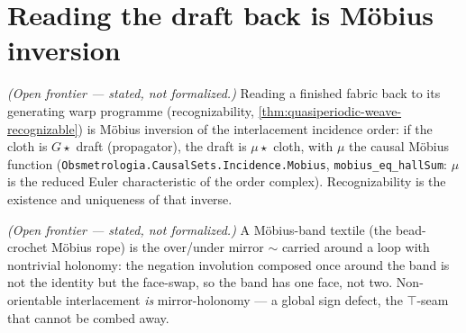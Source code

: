 \section{Reading the draft back is M\"obius inversion}

\begin{theorem}\label{thm:recognizability-is-mobius}\notready{}
\emph{(Open frontier --- stated, not formalized.)} Reading a finished fabric back to its
generating warp programme (recognizability, \cref{thm:quasiperiodic-weave-recognizable}) is
M\"obius inversion of the interlacement incidence order: if the cloth is $G\star$ draft
(propagator), the draft is $\mu\star$ cloth, with $\mu$ the causal M\"obius function
(\texttt{Obsmetrologia.CausalSets.Incidence.Mobius}, \texttt{mobius\_eq\_hallSum}: $\mu$ is the
reduced Euler characteristic of the order complex). Recognizability is the existence and
uniqueness of that inverse.
\end{theorem}

\begin{theorem}\label{thm:mobius-band-holonomy}\notready{}
\emph{(Open frontier --- stated, not formalized.)} A M\"obius-band textile (the
bead-crochet M\"obius rope) is the over/under mirror $\sim$ carried around a loop with
nontrivial holonomy: the negation involution composed once around the band is not the
identity but the face-swap, so the band has one face, not two. Non-orientable
interlacement \emph{is} mirror-holonomy --- a global sign defect, the $\top$-seam that
cannot be combed away.
\end{theorem}
